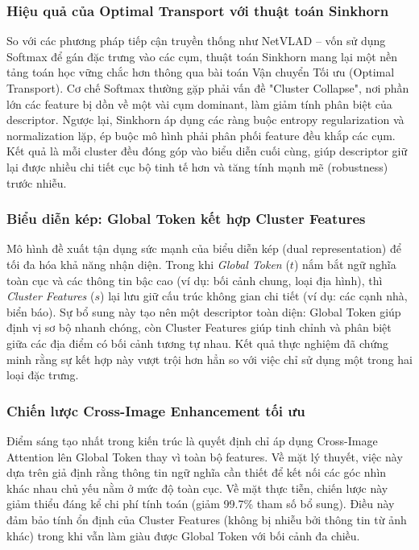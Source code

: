 \documentclass[12pt,a4paper]{article}
\begin{document}
    \subsubsection{Hiệu quả của Optimal Transport với thuật toán Sinkhorn}
    So với các phương pháp tiếp cận truyền thống như NetVLAD – vốn sử dụng Softmax để gán đặc trưng vào các cụm, thuật toán Sinkhorn mang lại một nền tảng toán học vững chắc hơn thông qua bài toán Vận chuyển Tối ưu (Optimal Transport). Cơ chế Softmax thường gặp phải vấn đề "Cluster Collapse", nơi phần lớn các feature bị dồn về một vài cụm dominant, làm giảm tính phân biệt của descriptor. Ngược lại, Sinkhorn áp dụng các ràng buộc entropy regularization và normalization lặp, ép buộc mô hình phải phân phối feature đều khắp các cụm. Kết quả là mỗi cluster đều đóng góp vào biểu diễn cuối cùng, giúp descriptor giữ lại được nhiều chi tiết cục bộ tinh tế hơn và tăng tính mạnh mẽ (robustness) trước nhiễu.

    \subsubsection{Biểu diễn kép: Global Token kết hợp Cluster Features}
    Mô hình đề xuất tận dụng sức mạnh của biểu diễn kép (dual representation) để tối đa hóa khả năng nhận diện. Trong khi \textit{Global Token} ($t$) nắm bắt ngữ nghĩa toàn cục và các thông tin bậc cao (ví dụ: bối cảnh chung, loại địa hình), thì \textit{Cluster Features} ($s$) lại lưu giữ cấu trúc không gian chi tiết (ví dụ: các cạnh nhà, biển báo). Sự bổ sung này tạo nên một descriptor toàn diện: Global Token giúp định vị sơ bộ nhanh chóng, còn Cluster Features giúp tinh chỉnh và phân biệt giữa các địa điểm có bối cảnh tương tự nhau. Kết quả thực nghiệm đã chứng minh rằng sự kết hợp này vượt trội hơn hẳn so với việc chỉ sử dụng một trong hai loại đặc trưng.

    \subsubsection{Chiến lược Cross-Image Enhancement tối ưu}
    Điểm sáng tạo nhất trong kiến trúc là quyết định chỉ áp dụng Cross-Image Attention lên Global Token thay vì toàn bộ features. Về mặt lý thuyết, việc này dựa trên giả định rằng thông tin ngữ nghĩa cần thiết để kết nối các góc nhìn khác nhau chủ yếu nằm ở mức độ toàn cục. Về mặt thực tiễn, chiến lược này giảm thiểu đáng kể chi phí tính toán (giảm 99.7\% tham số bổ sung). Điều này đảm bảo tính ổn định của Cluster Features (không bị nhiễu bởi thông tin từ ảnh khác) trong khi vẫn làm giàu được Global Token với bối cảnh đa chiều.
\end{document}
